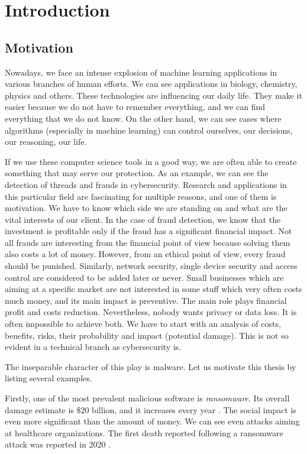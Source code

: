\chapter{Introduction} \label{chap:intro}
\section{Motivation}
Nowadays, we face an intense explosion of machine learning applications in various branches of human efforts. We can see applications in biology, chemistry, physics and others. These technologies are influencing our daily life. They make it easier because we do not have to remember everything, and we can find everything that we do not know. On the other hand, we can see cases where algorithms (especially in machine learning) can control ourselves, our decisions, our reasoning, our life.

If we use these computer science tools in a good way, we are often able to create something that may serve our protection. As an example, we can see the detection of threads and frauds in cybersecurity. Research and applications in this particular field are fascinating for multiple reasons, and one of them is motivation. We have to know which side we are standing on and what are the vital interests of our client.  In the case of fraud detection, we know that the investment is profitable only if the fraud has a significant financial impact. Not all frauds are interesting from the financial point of view because solving them also costs a lot of money. However, from an ethical point of view, every fraud should be punished. Similarly, network security, single device security and access control are considered to be added later or never. Small businesses which are aiming at a specific market are not interested in some stuff which very often costs much money, and its main impact is preventive. The main role plays financial profit and costs reduction. Nevertheless, nobody wants privacy or data loss. It is often impossible to achieve both. We have to start with an analysis of costs, benefits, risks, their probability and impact (potential damage). This is not so evident in a technical branch as cybersecurity is.

The inseparable character of this play is malware. Let us motivate this thesis by listing several examples.

Firstly, one of the most prevalent malicious software is \emph{ransomware}. Its overall damage estimate is $\$20$ billion, and it increases every year \cite{purplesec2021}. The social impact is even more significant than the amount of money. We can see even attacks aiming at healthcare organizations. The first death reported following a ransomware attack was reported in 2020 \cite{Cimpanu2020}.

